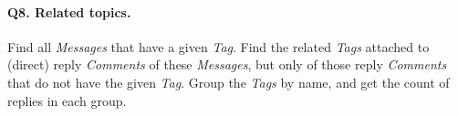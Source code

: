 \paragraph{\textbf{Q8}. Related topics.}
Find all \emph{Messages} that have a given \emph{Tag}. Find the related
\emph{Tags} attached to (direct) reply \emph{Comments} of these
\emph{Messages}, but only of those reply \emph{Comments} that do not
have the given \emph{Tag}.
Group the \emph{Tags} by name, and get the count of replies in each
group.
